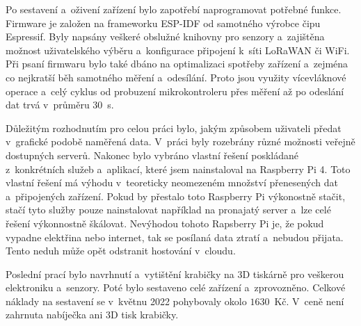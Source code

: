 Po sestavení a~oživení zařízení bylo zapotřebí naprogramovat potřebné funkce. Firmware je založen na frameworku ESP-IDF od samotného výrobce čipu Espressif. Byly napsány veškeré obslužné knihovny pro senzory a~zajištěna možnost uživatelského výběru a~konfigurace připojení k~síti LoRaWAN či WiFi. Při psaní firmwaru bylo také dbáno na optimalizaci spotřeby zařízení a~zejména co nejkratší běh samotného měření a~odesílání. Proto jsou využity vícevláknové operace a~celý cyklus od probuzení mikrokontroleru přes měření až po odeslání dat trvá v~průměru \SI{30}{\second}.

Důležitým rozhodnutím pro celou práci bylo, jakým způsobem uživateli předat v~grafické podobě naměřená data. V~práci byly rozebrány různé možnosti veřejně dostupných serverů. Nakonec bylo vybráno vlastní řešení poskládané z~konkrétních služeb a~aplikací, které jsem nainstaloval na Raspberry Pi 4. Toto vlastní řešení má výhodu v~teoreticky neomezeném množství přenesených dat a~připojených zařízení. Pokud by přestalo toto Raspberry Pi výkonostně stačit, stačí tyto služby pouze nainstalovat například na pronajatý server a~lze celé řešení výkonnostně škálovat. Nevýhodou tohoto Rapsberry Pi je, že pokud vypadne elektřina nebo internet, tak se posílaná data ztratí a~nebudou přijata. Tento neduh může opět odstranit hostování v~cloudu.

Poslední prací bylo navrhnutí a~vytištění krabičky na 3D tiskárně pro veškerou elektroniku a~senzory. Poté bylo sestaveno celé zařízení a~zprovozněno. Celkové náklady na sestavení se v~květnu 2022 pohybovaly okolo $1630$~Kč. V~ceně není zahrnuta nabíječka ani 3D tisk krabičky.